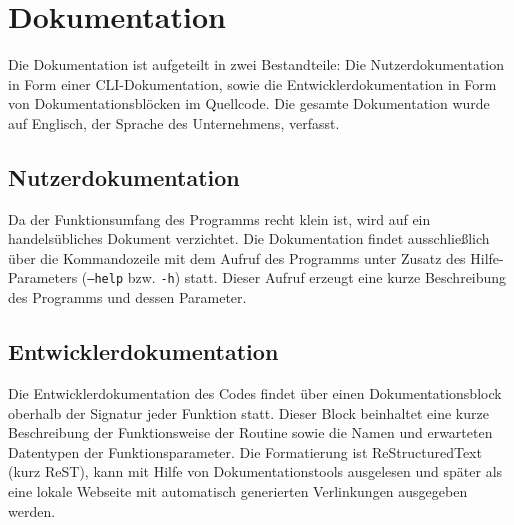 \section{Dokumentation}
\label{section:dokumentationsphase}
Die Dokumentation ist aufgeteilt in zwei Bestandteile: Die Nutzerdokumentation
in Form einer CLI-Dokumentation, sowie die Entwicklerdokumentation in Form von
Dokumentationsblöcken im Quellcode. Die gesamte Dokumentation wurde auf Englisch,
der Sprache des Unternehmens, verfasst.

\subsection{Nutzerdokumentation}
Da der Funktionsumfang des Programms recht klein ist, wird auf ein handelsübliches
Dokument verzichtet. Die Dokumentation findet ausschließlich über die Kommandozeile mit dem Aufruf des Programms unter Zusatz des Hilfe-Parameters (\texttt{---help} bzw. \texttt{-h}) statt.
Dieser Aufruf erzeugt eine kurze Beschreibung des Programms und dessen Parameter.

\subsection{Entwicklerdokumentation}
Die Entwicklerdokumentation des Codes findet über einen
Dokumentationsblock oberhalb der Signatur jeder Funktion statt. Dieser Block
beinhaltet eine kurze Beschreibung der Funktionsweise der Routine sowie die
Namen und erwarteten Datentypen der Funktionsparameter. Die Formatierung ist
ReStructuredText (kurz ReST), kann mit Hilfe von Dokumentationstools ausgelesen
und später als eine lokale Webseite mit automatisch generierten Verlinkungen ausgegeben werden.
